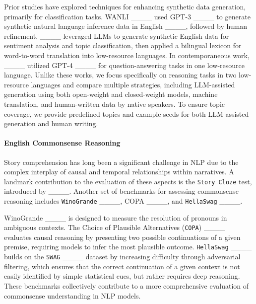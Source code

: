 Prior studies have explored techniques for enhancing synthetic data generation, primarily for classification tasks. WANLI ____ used GPT-3 ____ to generate synthetic natural language inference data in English ____, followed by human refinement. ____ leveraged LLMs to generate synthetic English data for sentiment analysis and topic classification, then applied a bilingual lexicon for word-to-word translation into low-resource languages. 
In contemporaneous work, ____ utilized GPT-4 ____ for question-answering tasks in one low-resource language. Unlike these works, we focus specifically on reasoning tasks in two low-resource languages and compare multiple strategies, including LLM-assisted generation using both open-weight and closed-weight models, machine translation, and human-written data by native speakers. To ensure topic coverage, we provide predefined topics and example seeds for both LLM-assisted generation and human writing.



\paragraph{English Commonsense Reasoning} 
Story comprehension has long been a significant challenge in NLP due to the complex interplay of causal and temporal relationships within narratives. A landmark contribution to the evaluation of these aspects is the \texttt{Story Cloze} test, introduced by ____. Another set of benchmarks for assessing commonsense reasoning includes \texttt{WinoGrande} ____, COPA ____, and \texttt{HellaSwag} ____. 

WinoGrande ____ is designed to measure the resolution of pronouns in ambiguous contexts. The Choice of Plausible Alternatives (\texttt{COPA}) ____ evaluates causal reasoning by presenting two possible continuations of a given premise, requiring models to infer the most plausible outcome. \texttt{HellaSwag} ____ builds on the \texttt{SWAG} ____ dataset by increasing difficulty through adversarial filtering, which ensures that the correct continuation of a given context is not easily identified by simple statistical cues, but rather requires deep reasoning. These benchmarks collectively contribute to a more comprehensive evaluation of commonsense understanding in NLP models.


